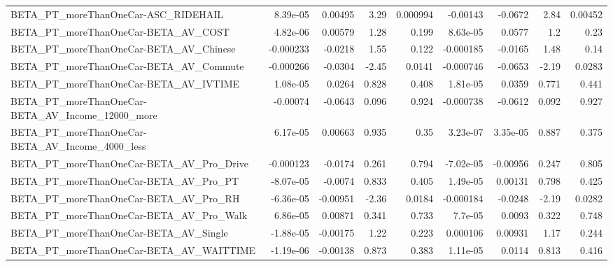 \begin{tabular}{lrrrrrrrr}
BETA\_PT\_moreThanOneCar-ASC\_RIDEHAIL                &    8.39e-05 &      0.00495 &      3.29 & 0.000994 &   -0.00143 &     -0.0672 &         2.84 &       0.00452 \\
BETA\_PT\_moreThanOneCar-BETA\_AV\_COST                &    4.82e-06 &      0.00579 &      1.28 &    0.199 &   8.63e-05 &      0.0577 &          1.2 &          0.23 \\
BETA\_PT\_moreThanOneCar-BETA\_AV\_Chinese             &   -0.000233 &      -0.0218 &      1.55 &    0.122 &  -0.000185 &     -0.0165 &         1.48 &          0.14 \\
BETA\_PT\_moreThanOneCar-BETA\_AV\_Commute             &   -0.000266 &      -0.0304 &     -2.45 &   0.0141 &  -0.000746 &     -0.0653 &        -2.19 &        0.0283 \\
BETA\_PT\_moreThanOneCar-BETA\_AV\_IVTIME              &    1.08e-05 &       0.0264 &     0.828 &    0.408 &   1.81e-05 &      0.0359 &        0.771 &         0.441 \\
BETA\_PT\_moreThanOneCar-BETA\_AV\_Income\_12000\_more   &    -0.00074 &      -0.0643 &     0.096 &    0.924 &  -0.000738 &     -0.0612 &        0.092 &         0.927 \\
BETA\_PT\_moreThanOneCar-BETA\_AV\_Income\_4000\_less    &    6.17e-05 &      0.00663 &     0.935 &     0.35 &   3.23e-07 &    3.35e-05 &        0.887 &         0.375 \\
BETA\_PT\_moreThanOneCar-BETA\_AV\_Pro\_Drive           &   -0.000123 &      -0.0174 &     0.261 &    0.794 &  -7.02e-05 &    -0.00956 &        0.247 &         0.805 \\
BETA\_PT\_moreThanOneCar-BETA\_AV\_Pro\_PT              &   -8.07e-05 &      -0.0074 &     0.833 &    0.405 &   1.49e-05 &     0.00131 &        0.798 &         0.425 \\
BETA\_PT\_moreThanOneCar-BETA\_AV\_Pro\_RH              &   -6.36e-05 &     -0.00951 &     -2.36 &   0.0184 &  -0.000184 &     -0.0248 &        -2.19 &        0.0282 \\
BETA\_PT\_moreThanOneCar-BETA\_AV\_Pro\_Walk            &    6.86e-05 &      0.00871 &     0.341 &    0.733 &    7.7e-05 &      0.0093 &        0.322 &         0.748 \\
BETA\_PT\_moreThanOneCar-BETA\_AV\_Single              &   -1.88e-05 &     -0.00175 &      1.22 &    0.223 &   0.000106 &     0.00931 &         1.17 &         0.244 \\
BETA\_PT\_moreThanOneCar-BETA\_AV\_WAITTIME            &   -1.19e-06 &     -0.00138 &     0.873 &    0.383 &   1.11e-05 &      0.0114 &        0.813 &         0.416 \\

\end{tabular}
